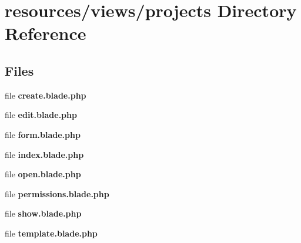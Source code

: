 \section{resources/views/projects Directory Reference}
\label{dir_ddf31cabc73f1e27385b792d26fba514}
\subsection*{Files}
\begin{DoxyCompactItemize}
\item 
file {\bf create.\+blade.\+php}
\item 
file {\bf edit.\+blade.\+php}
\item 
file {\bf form.\+blade.\+php}
\item 
file {\bf index.\+blade.\+php}
\item 
file {\bf open.\+blade.\+php}
\item 
file {\bf permissions.\+blade.\+php}
\item 
file {\bf show.\+blade.\+php}
\item 
file {\bf template.\+blade.\+php}
\end{DoxyCompactItemize}
